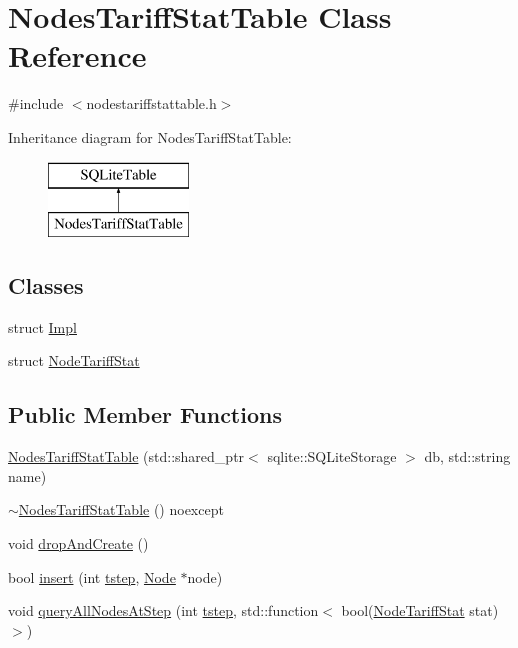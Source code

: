 \hypertarget{class_nodes_tariff_stat_table}{}\section{Nodes\+Tariff\+Stat\+Table Class Reference}
\label{class_nodes_tariff_stat_table}


{\ttfamily \#include $<$nodestariffstattable.\+h$>$}

Inheritance diagram for Nodes\+Tariff\+Stat\+Table\+:\begin{figure}[H]
\begin{center}
\leavevmode
\includegraphics[height=2.000000cm]{d1/d95/class_nodes_tariff_stat_table}
\end{center}
\end{figure}
\subsection*{Classes}
\begin{DoxyCompactItemize}
\item 
struct \mbox{\hyperlink{struct_nodes_tariff_stat_table_1_1_impl}{Impl}}
\item 
struct \mbox{\hyperlink{struct_nodes_tariff_stat_table_1_1_node_tariff_stat}{Node\+Tariff\+Stat}}
\end{DoxyCompactItemize}
\subsection*{Public Member Functions}
\begin{DoxyCompactItemize}
\item 
\mbox{\hyperlink{class_nodes_tariff_stat_table_a3838ddd3f499dc374b90d7238ee59854}{Nodes\+Tariff\+Stat\+Table}} (std\+::shared\+\_\+ptr$<$ sqlite\+::\+S\+Q\+Lite\+Storage $>$ db, std\+::string name)
\item 
\mbox{\hyperlink{class_nodes_tariff_stat_table_a3c080904c00da02f4251d4e76b5ead6c}{$\sim$\+Nodes\+Tariff\+Stat\+Table}} () noexcept
\item 
void \mbox{\hyperlink{class_nodes_tariff_stat_table_a79dfe205f2521aadcf068d00d14732b4}{drop\+And\+Create}} ()
\item 
bool \mbox{\hyperlink{class_nodes_tariff_stat_table_aa49c757faf0d644ab61d4a48e90cb13f}{insert}} (int \mbox{\hyperlink{thread__vessels_8cpp_a84bc73d278de929ec9974e1a95d9b23a}{tstep}}, \mbox{\hyperlink{class_node}{Node}} $\ast$node)
\item 
void \mbox{\hyperlink{class_nodes_tariff_stat_table_a4d70bfc71c6a79dae6bd846a9f1aeb51}{query\+All\+Nodes\+At\+Step}} (int \mbox{\hyperlink{thread__vessels_8cpp_a84bc73d278de929ec9974e1a95d9b23a}{tstep}}, std\+::function$<$ bool(\mbox{\hyperlink{struct_nodes_tariff_stat_table_1_1_node_tariff_stat}{Node\+Tariff\+Stat}} stat)$>$)
\end{DoxyCompactItemize}


